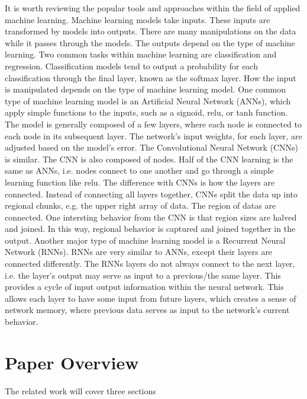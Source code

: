 It is worth reviewing the popular tools and approaches within the field of applied machine learning.  Machine learning models take inputs.  These inputs are transformed by models into outputs.  There are many manipulations on the data while it passes through the models.  The outputs depend on the type of machine learning.  Two common tasks within machine learning are classification and regression.  Classification models tend to output a probability for each classification through the final layer, known as the softmax layer.  How the input is manipulated depends on the type of machine learning model.  One common type of machine learning model is an Artificial Neural Network (ANNs), which apply simple functions to the inputs, such as a signoid, relu, or tanh function.  The model is generally composed of a few layers, where each node is connected to each node in its subsequent layer.  The network's input weights, for each layer, are adjusted based on the model's error.  The Convolutional Neural Network (CNNs) is similar.  The CNN is also composed of nodes.  Half of the CNN learning is the same as ANNs, i.e. nodes connect to one another and go through a simple learning function like relu.  The difference with CNNs is how the layers are connected.  Instead of connecting all layers together, CNNs split the data up into regional chunks, e.g. the upper right array of data.  The region of datas are connected.  One intersting behavior from the CNN is that region sizes are halved and joined.  In this way, regional behavior is captured and joined together in the output.  Another major type of machine learning model is a Recurrent Neural Network (RNNs).  RNNs are very similar to ANNs, except their layers are connected differently.  The RNNs layers do not always connect to the next layer, i.e. the layer's output may serve as input to a previous/the same layer.  This provides a cycle of input output information within the neural network.  This allows each layer to have some input from future layers, which creates a sense of network memory, where previous data serves as input to the network's current behavior.  

\section{Paper Overview}
The related work will cover three sections
